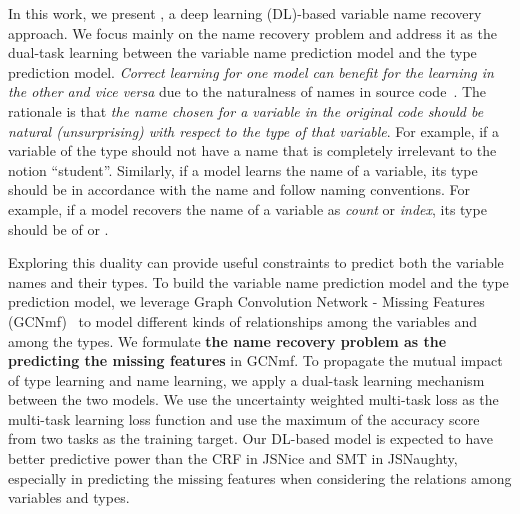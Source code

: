 


In this work, we present {\tool}, a deep learning (DL)-based variable
name recovery approach. We focus mainly on the name recovery problem
and address it as the dual-task learning between the variable name
prediction model and the type prediction model. {\em Correct learning
  for one model can benefit for the learning in the other and vice
  versa} due to the naturalness of names in source
code~\cite{hindle-icse12}. The rationale is that {\em the name chosen
  for a variable in the original code should be natural (unsurprising)
  with respect to the type of that variable}. For example, if a
variable of the type  should not have a name that is
completely irrelevant to the notion ``student''. Similarly, if a model
learns the name of a variable, its type should be in accordance with
the name and follow naming conventions. For example, if a model
recovers the name of a variable as {\em count} or {\em index}, its
type should be of  or .

Exploring this duality can provide useful constraints to predict both
the variable names and their types.  To build the variable name
prediction model and the type prediction model, we leverage Graph
Convolution Network - Missing Features (GCNmf)~\cite{GCNmf} to model
different kinds of relationships among the variables and among the
types. We formulate {\bf the name recovery problem as the
  predicting the missing features} in GCNmf. To propagate the
mutual impact of type learning and name learning, we apply a dual-task
learning mechanism between the two models. We use the uncertainty
weighted multi-task loss as the multi-task learning loss function and
use the maximum of the accuracy score from two tasks as the training
target. Our DL-based model is expected to have better predictive power
than the CRF in JSNice and SMT in JSNaughty, especially in predicting
the missing features when considering the relations among variables
and types.

